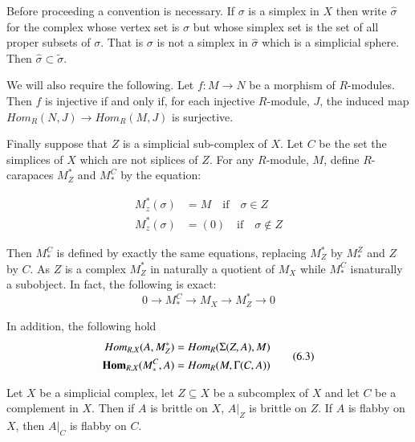 Before proceeding a convention is necessary. If $\sigma$ is a simplex in $X$ then write $\hat{\sigma}$ for the complex whose vertex set is $\sigma$ but whose simplex set is the set of all proper subsets of $\sigma$. That is $\sigma$ is not a simplex in $\hat{\sigma}$ which is a simplicial sphere. Then $\hat{\sigma} \subset \tilde{\sigma}$.

We will also require the following. Let $f: M \rightarrow N$ be a morphism of $R$-modules. Then $f$ is injective if and only if, for each injective $R$-module, $J$, the induced map $Hom_{R}(N, J)\rightarrow  Hom_{R}(M, J)$ is surjective.

Finally suppose that $Z$ is a simplicial sub-complex of $X$. Let $C$ be the set the simplices of $X$ which are not siplices of $Z$. For any $R$-module, $M$, define $R$-carapaces $M_{Z}^{*}$ and $M_{*}^{C}$ by the equation:

\begin{equation*}
\begin{aligned}\label{chap6-eq-6.2}
M_{z}^{*}(\sigma) &= M \quad \text{if} \quad \sigma \in Z \\
M_{z}^{*}(\sigma) &= (0)\quad \text{if} \quad \sigma \notin Z
\end{aligned}\tag{6.2}
\end{equation*}

Then $M_{*}^{C}$ is defined by exactly the same equations, replacing $M_{Z}^{*}$ by $M_{*}^{Z}$ and $Z$ by $C$. As $Z$ is a complex $M_{Z}^{*}$ in naturally a quotient of $M_{X}$ while $M_{*}^{C}$ is\pageoriginale naturally a subobject. In fact, the following is exact:
$$
0 \rightarrow M_{*}^{C}\rightarrow M_{X}\rightarrow M_{Z}^{*} \rightarrow 0
$$

In addition, the following hold
\begin{equation*}
\begin{aligned}\label{chap6-eq-6.3}
Hom_{R, X}(A, M_{Z}^{*}) &= Hom_{R}(\Sigma(Z, A), M)\\
\operatorname{\mathbf{Hom}}_{R, X}(M_{*}^{C}, A) &= Hom_{R}(M, \Gamma (C, A))
\end{aligned}\tag{6.3}
\end{equation*}

\setcounter{definition}{3}
\begin{seclem}\label{chap6-lemma-6.4}
Let $X$ be a simplicial complex, let $Z \subseteq X$ be a subcomplex of $X$ and let $C$ be a complement in $X$. Then if $A$ is brittle on $X$, $A|_{Z}$ is brittle on $Z$. If $A$ is flabby on $X$, then $A|_{C}$ is flabby on $C$.
\end{seclem}

